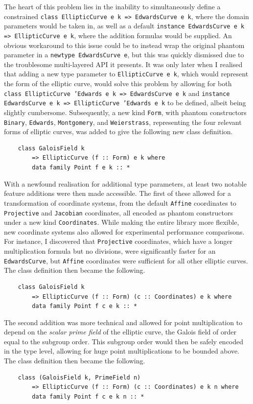 \documentclass[11pt]{article}
\begin{document}
The heart of this problem lies in the inability to simultaneously define a constrained \texttt{class EllipticCurve e k => EdwardsCurve e k}, where the domain parameters would be taken in, as well as a default \texttt{instance EdwardsCurve e k => EllipticCurve e k}, where the addition formulas would be supplied. An obvious workaround to this issue could be to instead wrap the original phantom parameter in a \texttt{newtype EdwardsCurve e}, but this was quickly dismissed due to the troublesome multi-layered API it presents. It was only later when I realised that adding a new type parameter to \texttt{EllipticCurve e k}, which would represent the form of the elliptic curve, would solve this problem by allowing for both \texttt{class EllipticCurve 'Edwards e k => EdwardsCurve e k} and \texttt{instance EdwardsCurve e k => EllipticCurve 'Edwards e k} to be defined, albeit being slightly cumbersome. Subsequently, a new kind \texttt{Form}, with phantom constructors \texttt{Binary}, \texttt{Edwards}, \texttt{Montgomery}, and \texttt{Weierstrass}, representing the four relevant forms of elliptic curves, was added to give the following new class definition.
\begin{verbatim}
    class GaloisField k
        => EllipticCurve (f :: Form) e k where
        data family Point f e k :: *
\end{verbatim}

With a newfound realisation for additional type parameters, at least two notable feature additions were then made accessible. The first of these allowed for a transformation of coordinate systems, from the default \texttt{Affine} coordinates to \texttt{Projective} and \texttt{Jacobian} coordinates, all encoded as phantom constructors under a new kind \texttt{Coordinates}. While making the entire library more flexible, new coordinate systems also allowed for experimental performance comparisons. For instance, I discovered that \texttt{Projective} coordinates, which have a longer multiplication formula but no divisions, were significantly faster for an \texttt{EdwardsCurve}, but \texttt{Affine} coordinates were sufficient for all other elliptic curves. The class definition then became the following.
\begin{verbatim}
    class GaloisField k
        => EllipticCurve (f :: Form) (c :: Coordinates) e k where
        data family Point f c e k :: *
\end{verbatim}

The second addition was more technical and allowed for point multiplication to depend on the \emph{scalar prime field} of the elliptic curve, the Galois field of order equal to the subgroup order. This subgroup order would then be safely encoded in the type level, allowing for huge point multiplications to be bounded above. The class definition then became the following.
\begin{verbatim}
    class (GaloisField k, PrimeField n)
        => EllipticCurve (f :: Form) (c :: Coordinates) e k n where
        data family Point f c e k n :: *
\end{verbatim}
\end{document}
